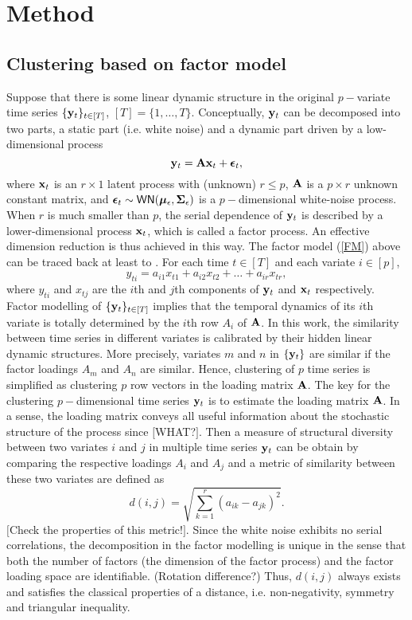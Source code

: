 \documentclass{statsoc}
\begin{document}
\section{Method}
\subsection{Clustering based on factor model}
Suppose that there is some linear dynamic structure in the original $p-$variate time series $\{{\bf y}_t\}_{t\in[T]}$, $[T]=\{1,\ldots,T\}$. Conceptually, ${\bf y}_t$ can be decomposed into two parts, a static part (i.e. white noise) and a dynamic part driven by a low-dimensional process
\begin{equation}\label{FM}
{\bf y}_t={\bf A}{\bf x}_t+{\bm\epsilon}_t,
\end{equation}
where ${\bf x}_t$ is an $r\times 1$ latent process with (unknown) $r\leq p$, $\bf A$ is a $p\times r$ unknown constant matrix, and ${\bm \epsilon}_t\sim{\sf WN}({\bm\mu}_\epsilon,{\bf\Sigma}_\epsilon)$ is a $p-$dimensional white-noise process. When $r$ is much smaller than $p$, the serial dependence of ${\bf y}_t$ is described by a lower-dimensional process ${\bf x}_t$, which is called a factor process. An effective dimension reduction is thus achieved in this way. The factor model (\ref{FM}) above can be traced back at least to \citet{pb_fm87}. For each time $t\in[T]$ and each variate $i\in[p]$,
\[y_{ti}=a_{i1}x_{t1}+a_{i2}x_{t2}+\ldots+a_{ir}x_{tr},\]
where $y_{ti}$ and $x_{tj}$ are the $i$th and $j$th components of ${\bf y}_t$ and ${\bf x}_t$ respectively. Factor modelling of $\{{\bf y}_t\}_{t\in[T]}$ implies that the temporal dynamics of its $i$th variate is totally determined by the $i$th row $A_i$ of $\bf A$. In this work, the similarity between time series in different variates is calibrated by their hidden linear dynamic structures. More precisely, variates $m$ and $n$ in $\{{\bf y}_t\}$ are similar if the factor loadings $A_m$ and $A_n$ are similar. Hence, clustering of $p$ time series is simplified as clustering $p$ row vectors in the loading matrix $\bf A$. The key for the clustering $p-$dimensional time series ${\bf y}_t$ is to estimate the loading matrix $\bf A$. In a sense, the loading matrix conveys all useful information about the stochastic structure of the process since $[${\sf WHAT?}$]$. Then a measure of structural diversity between two variates $i$ and $j$ in multiple time series ${\bf y}_t$ can be obtain by comparing the respective loadings $A_i$ and $A_j$ and a metric of similarity between these two variates are defined as
\[d(i,j)=\sqrt{\sum_{k=1}^r(a_{ik}-a_{jk})^2}.\]
$[${\sf Check the properties of this metric!}$]$. Since the white noise exhibits no serial correlations, the decomposition in the factor modelling is unique in the sense that both the number of factors (the dimension of the factor process) and the factor loading space are identifiable. (\textsf{Rotation difference?}) Thus, $d(i,j)$ always exists and satisfies the classical properties of a distance, i.e. non-negativity, symmetry and triangular inequality.
\end{document}
